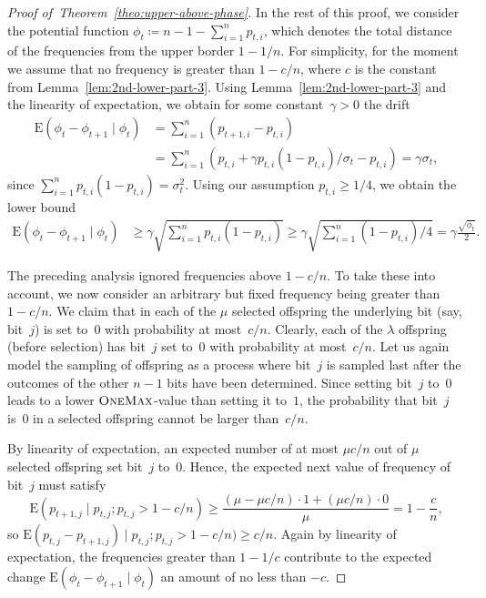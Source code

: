 \documentclass[11pt, a4paper]{article}
\newcommand*{\om}{\textsc{OneMax}\xspace}
\newcommand*{\E}{\mathrm{E}}
\newenvironment{proofof}[1]{\begin{proof}[Proof of~#1]}{\end{proof}}
\begin{document}
\begin{proofof}{Theorem~\ref{theo:upper-above-phase}}
In the rest of this proof, we consider the potential function $\phi_t\coloneqq n-1-\sum_{i=1}^n p_{t,i}$, 
which denotes the total distance of the frequencies from the upper border $1-1/n$. For simplicity, 
for the moment we assume that no frequency is greater than $1-c/n$, where 
$c$ is the constant from Lemma~\ref{lem:2nd-lower-part-3}. Using 
Lemma~\ref{lem:2nd-lower-part-3} and the linearity of expectation, we obtain for some constant~$\gamma>0$ 
the drift 
\begin{align*}
 \E(\phi_t-\phi_{t+1}\mid \phi_t) & = \sum_{i=1}^n (p_{t+1,i}-p_{t,i}) \\
& = \sum_{i=1}^n (p_{t,i}+\gamma 
p_{t,i}(1-p_{t,i})/\sigma_t - p_{t,i}) = \gamma 
\sigma_t,
\end{align*}
since $\sum_{i=1}^n p_{t,i}(1-p_{t,i})=\sigma_t^2$. Using our assumption 
$p_{t,i}\ge 1/4$, we obtain the lower bound 
\begin{align}
 \E(\phi_t-\phi_{t+1}\mid \phi_t) & \ge \gamma \sqrt{\sum_{i=1}^n p_{t,i}(1-p_{t,i})} 
 \ge 
 \gamma\sqrt{\sum_{i=1}^n (1-p_{t,i})/4} = \gamma \frac{\sqrt{\phi_t}}{2}. 
\label{eq:upper-bound-above-drift-sqrt}
\end{align}

The preceding analysis ignored frequencies above $1-c/n$. To take these into account,  we now consider an arbitrary 
but fixed frequency being greater than $1-c/n$. We claim that in each of the $\mu$ 
selected offspring the underlying bit (say, bit~$j$)  
is set to~$0$ with probability at most~$c/n$. Clearly, each of the $\lambda$ offspring (before selection) has bit~$j$
 set to~$0$ with probability at most~$c/n$. Let us again model the sampling of offspring as a process where bit~$j$ 
is sampled last after the outcomes of the other $n-1$ bits have been determined. 
Since setting bit~$j$ to~$0$ leads to a lower $\om$-value than setting it to~$1$, 
the probability that  bit~$j$ is~$0$ in a selected offspring cannot be larger than~$c/n$.  

By linearity of expectation, an expected number of at most $\mu c/n$ out of $\mu$ selected offspring set bit~$j$ to~$0$. 
Hence, the expected next value of frequency of bit~$j$ must satisfy 
\[
\E(p_{t+1,j} \mid p_{t,j}; p_{t,j}>1-c/n) \ge \frac{(\mu-\mu c/n)\cdot 1 + (\mu c/n) \cdot 0}{\mu} = 1-\frac{c}{n},
\]
so $\E(p_{t,j} - p_{t+1,j}) \mid p_{t,j}; p_{t,j}>1-c/n) \ge c/n$. 
Again by 
linearity of expectation, the frequencies greater than $1-1/c$ contribute to the 
expected change $\E(\phi_t-\phi_{t+1}\mid\phi_t)$ an amount of no less than $-c$.


\end{proofof}
\end{document}
